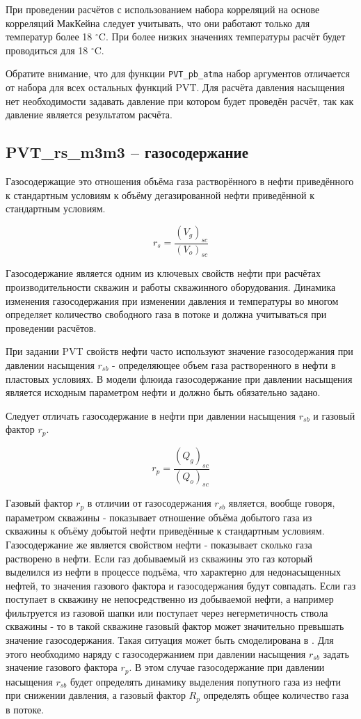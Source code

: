 При проведении расчётов с использованием набора корреляций на основе корреляций МакКейна следует учитывать, что они работают только для температур более 18 $^\circ$C. При более низких значениях температуры расчёт будет проводиться для 18 $^\circ$C.

Обратите внимание, что для функции \texttt{PVT_pb_atma} набор аргументов отличается от набора для всех остальных функций PVT. Для расчёта давления насыщения нет необходимости задавать давление при котором будет проведён расчёт, так как давление является результатом расчёта.

\subsection{PVT\_rs\_m3m3 – газосодержание}

Газосодержащие это отношения объёма газа растворённого в нефти приведённого к стандартным условиям к объёму дегазированной нефти приведённой к стандартным условиям. 

$$r_s = \frac{(V_g)_{sc}}{(V_o)_{sc}}$$

Газосодержание является одним из ключевых свойств нефти при расчётах производительности скважин и работы скважинного оборудования. Динамика изменения газосодержания при изменении давления и температуры во многом определяет количество свободного газа в потоке и должна учитываться при проведении расчётов. 

При задании PVT свойств нефти часто используют значение газосодержания при давлении насыщения $r_{sb}$ - определяющее объем газа растворенного в нефти в пластовых условиях. В модели флюида \unf{} газосодержание при давлении насыщения является исходным параметром нефти и должно быть обязательно задано. 

Следует отличать газосодержание в нефти при давлении насыщения $r_{sb}$ и газовый фактор $r_p$.

$$r_p = \frac{(Q_g)_{sc}}{(Q_o)_{sc}}$$

Газовый фактор $r_{p}$  в отличии от газосодержания $r_{sb}$  является, вообще говоря, параметром скважины - показывает отношение объёма добытого газа из скважины к объёму добытой нефти приведённые к стандартным условиям. Газосодержание же является свойством нефти - показывает сколько газа растворено в нефти. Если газ добываемый из скважины это газ который выделился из нефти в процессе подъёма, что характерно для недонасыщенных нефтей, то значения газового фактора и газосодержания будут совпадать. Если газ поступает в скважину не непосредственно из добываемой нефти, а например фильтруется из газовой шапки или поступает через негерметичность ствола скважины - то в такой скважине газовый фактор может значительно превышать значение газосодержания. Такая ситуация может быть смоделирована в \unf{}. Для этого необходимо наряду с газосодержанием при давлении насыщения $r_{sb}$ задать значение газового фактора $r_p$. В этом случае газосодержание при давлении насыщения $r_{sb}$  будет определять динамику выделения попутного газа из нефти при снижении давления, а газовый фактор $R_p$ определять общее количество газа в потоке. 

